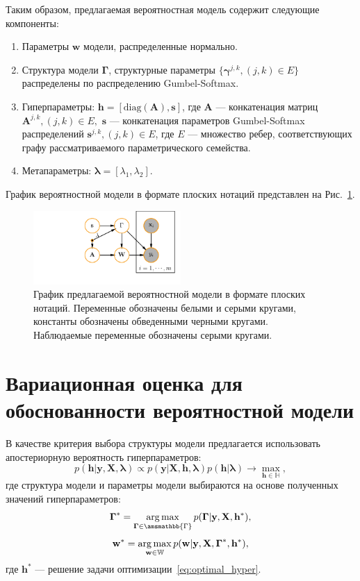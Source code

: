 Таким образом, предлагаемая вероятностная модель содержит следующие компоненты:
\begin{enumerate}
\item Параметры $\mathbf{w}$ модели, распределенные нормально.
\item Структура модели $\boldsymbol{\Gamma}$, структурные параметры $\{\boldsymbol{\gamma}^{j,k}, (j,k) \in E\}$ распределены по распределению Gumbel-Softmax.
\item Гиперпараметры: $\mathbf{h} = [\text{diag}(\mathbf{A}), \mathbf{s}]$, где $\mathbf{A}$ --- конкатенация матриц $\mathbf{A}^{j,k}, (j,k) \in E,$ $\mathbf{s}$ --- конкатенация параметров Gumbel-Softmax распределений $\mathbf{s}^{j,k}, (j,k) \in E$, где $E$ --- множество ребер, соответствующих графу рассматриваемого параметрического семейства.
\item Метапараметры: $\boldsymbol{\lambda} = [\lambda_1, \lambda_2].$
\end{enumerate}

График вероятностной модели в формате плоских нотаций представлен на Рис.~\ref{fig:plate_prob}.
\begin{figure}
\centering
   \includegraphics[width=0.5\textwidth]{plots/notebooks/simple_plate.pdf}
\caption{График предлагаемой вероятностной модели в формате плоских нотаций. Переменные обозначены белыми и серыми кругами, константы обозначены обведенными черными кругами. Наблюдаемые переменные обозначены серыми кругами.}
\label{fig:plate_prob}
\end{figure}

\section{Вариационная оценка для обоснованности вероятностной модели}
В качестве критерия выбора структуры модели предлагается использовать апостериорную вероятность гиперпараметров:
\begin{equation}
\label{eq:optimal_hyper}
    p(\mathbf{h}|\mathbf{y}, \mathbf{X}, \boldsymbol{\lambda}) \propto p(\mathbf{y}|\mathbf{X}, \mathbf{h}, \boldsymbol{\lambda}) p(\mathbf{h}|\boldsymbol{\lambda}) \to \max_{\mathbf{h} \in \mathbb{H}},
\end{equation}
где структура модели и параметры модели выбираются на основе полученных значений гиперпараметров:
\[
    \boldsymbol{\Gamma}^* = \argmax_{\boldsymbol{\Gamma} \in \amsmathbb{\Gamma}} p(\boldsymbol{\Gamma}|\mathbf{y}, \mathbf{X}, \mathbf{h}^*),
\]
\[
    \mathbf{w}^* = \operatorname*{arg\,max}_{\mathbf{w} \in \mathbb{W}} p(\mathbf{w}|\mathbf{y}, \mathbf{X}, \boldsymbol{\Gamma}^*, \mathbf{h}^*),
\]
где $\mathbf{h}^*$ --- решение задачи оптимизации~\eqref{eq:optimal_hyper}.

